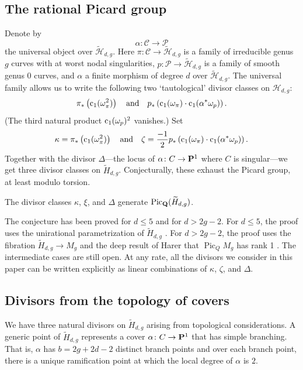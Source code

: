 \documentclass{amsart}
\renewcommand{\c}{{\rm c}}
\newcommand{\orb}{\mathcal}
\providecommand {\Q}{{\bf Q}}
\renewcommand {\P}{{\bf P}}
\providecommand {\from}{{\colon}}
\providecommand{\Pic}{\operatorname{Pic}}
\numberwithin{equation}{section}
\begin{document}
\subsection{The rational Picard group}
Denote by
\[ \alpha \from {\orb C} \to {\orb P}\]
the universal object over $\widetilde{\orb H}_{d,g}$.
Here $\pi \from \orb C \to \widetilde{\orb H}_{d,g}$ is a family of irreducible genus $g$ curves with at worst nodal singularities, $p \from \orb P \to \widetilde{\orb H}_{d,g}$ is a family of smooth genus $0$ curves, and $\alpha$ a finite morphism of degree $d$ over $\widetilde{\orb H}_{d,g}$.
The universal family allows us to write the following two `tautological' divisor classes on $\mathcal H_{d,g}$:
\[ \pi_*\left(\c_1(\omega_\pi^2)\right) \quad \text{and} \quad p_* \left(\c_1(\omega_\pi) \cdot \c_1(\alpha^* \omega_p)\right).\]
(The third natural product $\c_1(\omega_p)^2$ vanishes.)
Set 
\[ \kappa = \pi_*\left(\c_1(\omega_\pi^2)\right) \quad \text{and} \quad \zeta = \frac{-1}{2}p_* \left(\c_1(\omega_\pi) \cdot \c_1(\alpha^* \omega_p)\right).\]
Together with the divisor $\Delta$---the locus of $\alpha \from C \to \P^1$ where $C$ is singular---we get three divisor classes on $\widetilde H_{d,g}$.
Conjecturally, these exhaust the Picard group, at least modulo torsion.
\begin{conjecture}
  \label{conj:pic}
  The divisor classes $\kappa$, $\xi$, and $\Delta$ generate $\Pic_\Q(\widetilde H_{d,g})$.
\end{conjecture}

The conjecture has been proved for $d \leq 5$ and for $d > 2g-2$.
For $d \leq 5$, the proof uses the unirational parametrization of $\widetilde H_{d,g}$ \cite{deo.pat:15}.
For $d > 2g-2$, the proof uses the fibration $\widetilde H_{d,g} \to M_g$ and the deep result of Harer that $\Pic_Q M_g$ has rank 1 \cite{moc:95,dia.edi:96}.
The intermediate cases are still open.
At any rate, all the divisors we consider in this paper can be written explicitly as linear combinations of $\kappa$, $\zeta$, and $\Delta$.

\subsection{Divisors from the topology of covers}\label{sec:ram}
We have three natural divisors on $\widetilde H_{d,g}$ arising from topological considerations.
A generic point of $\widetilde H_{d,g}$ represents a cover $\alpha \from C \to \P^1$ that has simple branching.
That is, $\alpha$ has $b = 2g+2d-2$ distinct branch points and over each branch point, there is a unique ramification point at which the local degree of $\alpha$ is $2$.
\end{document}
